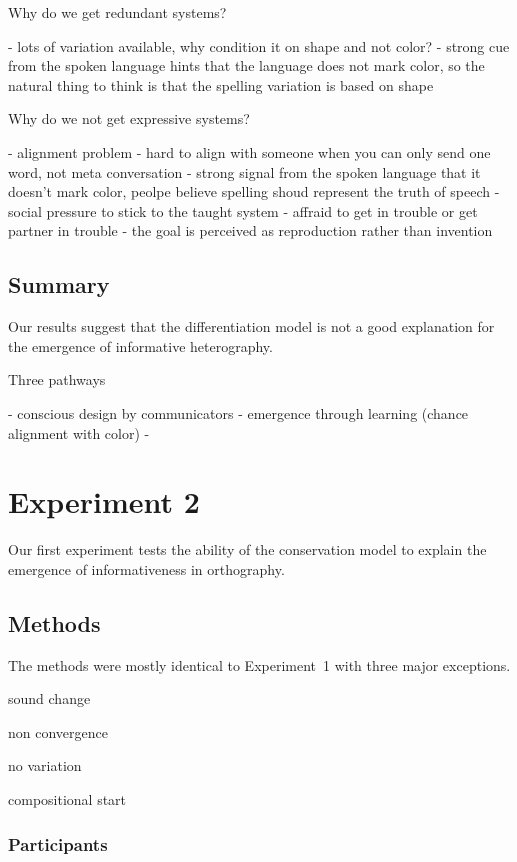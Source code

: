 \documentclass[doc,biblatex]{apa7}
\begin{document}
Why do we get redundant systems?

- lots of variation available, why condition it on shape and not color?
- strong cue from the spoken language hints that the language does not mark color, so the natural thing to think is that the spelling variation is based on shape


Why do we not get expressive systems?

- alignment problem - hard to align with someone when you can only send one word, not meta conversation
- strong signal from the spoken language that it doesn't mark color, peolpe believe spelling shoud represent the truth of speech
- social pressure to stick to the taught system - affraid to get in trouble or get partner in trouble
- the goal is perceived as reproduction rather than invention


\subsection{Summary}

Our results suggest that the differentiation model is not a good explanation for the emergence of informative heterography. 

Three pathways

- conscious design by communicators
- emergence through learning (chance alignment with color)
- 


\section{Experiment 2}

Our first experiment tests the ability of the conservation model to explain the emergence of informativeness in orthography.

\subsection{Methods}

The methods were mostly identical to Experiment~1 with three major exceptions.

sound change

non convergence

no variation

compositional start

\subsubsection{Participants}
\end{document}
